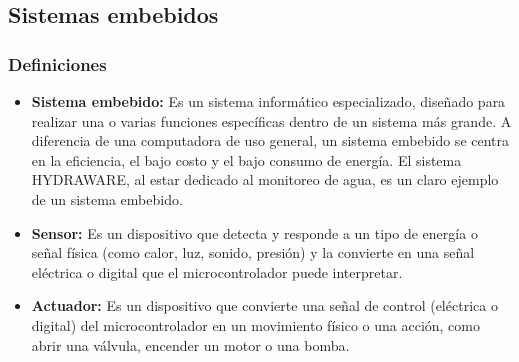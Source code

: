 \documentclass[a4paper,12pt]{article}
\begin{document}
	
	\subsection{Sistemas embebidos}
	\subsubsection{Definiciones}
	\begin{itemize}
		\item \textbf{Sistema embebido:} Es un sistema informático especializado, diseñado para realizar una o varias funciones específicas dentro de un sistema más grande. A diferencia de una computadora de uso general, un sistema embebido se centra en la eficiencia, el bajo costo y el bajo consumo de energía. El sistema HYDRAWARE, al estar dedicado al monitoreo de agua, es un claro ejemplo de un sistema embebido.
		\item \textbf{Sensor:} Es un dispositivo que detecta y responde a un tipo de energía o señal física (como calor, luz, sonido, presión) y la convierte en una señal eléctrica o digital que el microcontrolador puede interpretar.
		\item \textbf{Actuador:} Es un dispositivo que convierte una señal de control (eléctrica o digital) del microcontrolador en un movimiento físico o una acción, como abrir una válvula, encender un motor o una bomba.
	\end{itemize}
\end{document}
